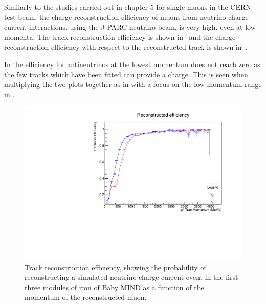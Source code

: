 Similarly to the studies carried out in chapter 5 for single muons in the CERN test beam, the charge reconstruction efficiency of muons from neutrino charge current interactions, using the J-PARC neutrino beam, is very high, even at low momenta. The track reconstruction efficiency is shown in~ and the charge reconstruction efficiency with respect to the reconstructed track is shown in~.


In  the efficiency for antineutrinos at the lowest momentum does not reach zero as the few tracks which have been fitted can provide a charge. This is seen when multiplying the two plots together as in  with a focus on the low momentum range in .




\begin{figure}[h!]
\centering
\includegraphics[width=.9\textwidth]{figures/NeutrinoChap/Neutrino/T2KIronRecEff.pdf}
\caption{Track reconstruction efficiency, showing the probability of reconstructing a simulated neutrino charge current event in the first three modules of iron of Baby MIND as a function of the momentum of the reconstructed muon.}
\label{fig:IronMINDfitted}
\end{figure}

